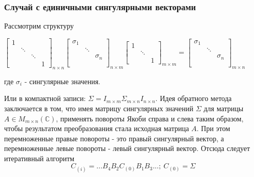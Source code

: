 \subsubsection{Случай с единичными сингулярными векторами}
Рассмотрим структуру

\begin{center}
    $\begin{bmatrix}
        1 & & & \\
         & \ddots & & \\
         & & \ddots & \\
         & & & 1
    \end{bmatrix}_{n \times n}
    \begin{bmatrix}
        \sigma_1 & & \\
         & \ddots & \\
         & & \sigma_n \\
         & & \\
         & & 
    \end{bmatrix}_{n \times m}
    \begin{bmatrix}
        1 & & \\
         & \ddots & \\
         & & 1
    \end{bmatrix}_{m \times m}
    =
    \begin{bmatrix}
        \sigma_1 & & \\
         & \ddots & \\
         & & \sigma_n \\
         & & \\
         & & 
    \end{bmatrix}_{m \times n}$
    
    \vspace{1em} 
    где $\sigma_i$ - сингулярные значения.
\end{center}

Или в компактной записи: $\Sigma = I_{m\times m}\Sigma_{m\times n}I_{n\times n}$.
Идея обратного метода заключается в том, что имея матрицу сингулярных значений $\Sigma$ для матрицы $A\in M_{m\times n}(\mathbb{C})$, применять повороты Якоби справа и слева таким образом, чтобы результатом преобразования стала исходная матрица $A$. При этом перемноженные правые повороты - это правый сингулярный вектор, а перемноженные левые повороты - левый сингулярный вектор. Отсюда следует итеративный алгоритм
\begin{equation}
    C_{(i)}=...B_4B_2C_{(0)}B_1B_3...;\ C_{(0)} = \Sigma
\end{equation}

